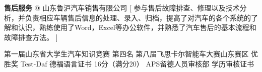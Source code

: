 \documentclass[zh]{resume}
\begin{document}
\begin{experiences}
	{\textbf{售后服务} @ 山东鲁沪汽车销售有限公司}%
	[ 参与售后故障排查、修理以及技术分析，并负责相应车辆售后信息的处理、录入、归档，提高了对汽车的各个系统的了解和认识，熟练使用了Word，Excel等办公软件，并熟悉了汽车售后的基本流程和故障排查方法。
	]
\end{experiences}


\begin{competences}
	
\end{competences}

\begin{entries}
	{第一届山东省大学生汽车知识竞赛 \textbullet 第四名}
	{第八届飞思卡尔智能车大赛山东赛区 \textbullet 优胜奖}
	{Test-Daf 德福语言证书 \textbullet 16分（满分20）}
	{APS留德人员审核部 \textbullet 学历审核证书}
\end{entries}

\clearpage
\end{document}
